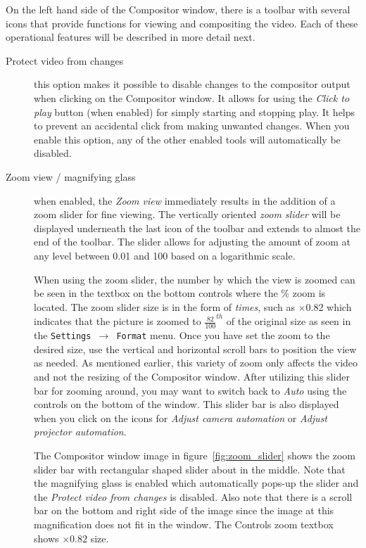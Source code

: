 On the left hand side of the Compositor window, there is a toolbar with several icons that
provide functions for viewing and compositing the video. Each of these operational features 
will be described in more detail next. 
\begin{description}
    \item[Protect video from changes] this option makes it possible to disable changes to the
compositor output when clicking on the Compositor window. It allows for using the
\textit{Click to play} button (when enabled) for simply starting and stopping play.  It helps
to prevent an accidental click from making unwanted changes. When you enable this option, any
of the other enabled tools will automatically be disabled.

     \item[Zoom view / magnifying glass]  when enabled, the \textit{Zoom view} immediately results
in the addition of a zoom slider for fine viewing.  
The vertically oriented \textit{zoom slider} will be displayed underneath the last icon of the toolbar and extends
to almost the end of the toolbar.
The slider allows for adjusting the amount of zoom at any level between 0.01 and 100 based on a logarithmic scale.  

When using the zoom slider, the number by which the view is zoomed can be seen in the textbox 
on the bottom controls where the \% zoom is located.  
The zoom slider size is in the form of \textit{times}, such as $\times$0.82 which indicates that the picture is zoomed to $\frac{82}{100}^{th}$ of the original size as seen in the \texttt{Settings $\rightarrow$ Format} menu.  
Once you have set the zoom to the desired size, use the vertical and horizontal scroll bars to position the view as needed.
As mentioned earlier, this
variety of zoom only affects the video and not the resizing of the Compositor window.  After
utilizing this slider bar for zooming around, you may want to switch back to \textit{Auto} 
using the controls on the bottom of the window.
This slider bar is also displayed
when you click on the icons for \textit{Adjust camera automation} or \textit{Adjust projector automation}.  

The Compositor window image in figure~\ref{fig:zoom_slider} shows the zoom slider bar with rectangular shaped slider about in the middle.  Note that the magnifying glass is enabled which
automatically pops-up the slider and the \textit{Protect video from changes} is disabled.  Also note that
there is a scroll bar on the bottom and right side of the image since the image at this magnification
does not fit in the window.
The Controls zoom textbox shows $\times0.82$ size.  
\end{description}


